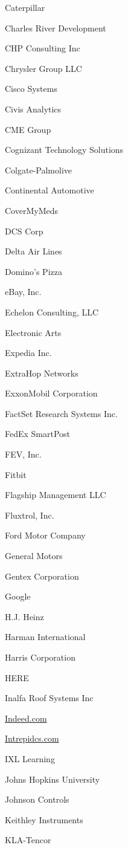 \documentclass[twoside]{article}
\begin{document}
\begin{center}
\begin{multicols}{5}
\begin{FlushLeft}
\begin{compactitem}
\item Caterpillar
\item Charles River Development
\item CHP Consulting Inc
\item Chrysler Group LLC
\item Cisco Systems
\item Civis Analytics
\item CME Group
\item Cognizant Technology Solutions
\item Colgate-Palmolive
\item Continental Automotive
\item CoverMyMeds
\item DCS Corp
\item Delta Air Lines
\item Domino's Pizza
\item eBay, Inc.
\item Echelon Consulting, LLC
\item Electronic Arts
\item Expedia Inc.
\item ExtraHop Networks
\item ExxonMobil Corporation
\item FactSet Research Systems Inc.
\item FedEx SmartPost
\item FEV, Inc.
\item Fitbit
\item Flagship Management LLC
\item Fluxtrol, Inc.
\item Ford Motor Company
\item General Motors
\item Gentex Corporation
\item Google
\item H.J. Heinz
\item Harman International
\item Harris Corporation
\item HERE
\item Inalfa Roof Systems Inc
\item \url{Indeed.com}
\item \url{Intrepidcs.com}
\item IXL Learning
\item Johns Hopkins University
\item Johnson Controls
\item Keithley Instruments
\item KLA-Tencor

\end{compactitem}
\end{FlushLeft}
\end{multicols}
\end{center}
\end{document}
